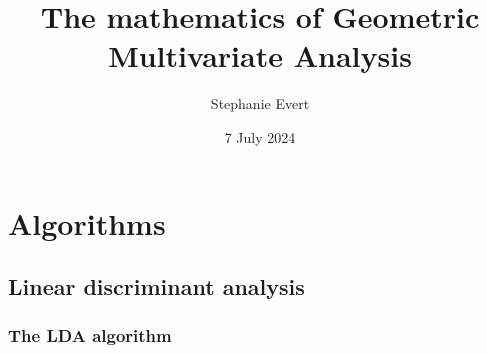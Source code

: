 \documentclass[a4paper]{article}
\title{The mathematics of Geometric Multivariate Analysis}
\author{Stephanie Evert}
\date{7 July 2024}
\begin{document}
\maketitle

\tableofcontents

\section{Algorithms}
\label{sec:algorithms}

\subsection{Linear discriminant analysis}
\label{sec:algorithms:lda}

\subsubsection{The LDA algorithm}
\label{sec:algorithms:lda:standard}
\end{document}
